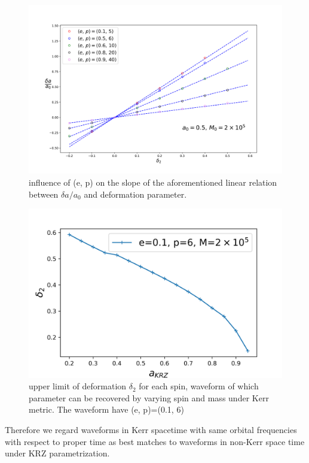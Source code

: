\documentclass{article}
\begin{document}
\begin{figure}[!htb]
	\centering
	\includegraphics[width=16cm]{d2_deltaspin_ep.png}

	\caption{influence of (e, p) on the slope of the aforementioned linear relation between $\delta a/a_0$ and deformation parameter. }
	\label{ep_slope}
\end{figure}

\begin{figure}[!htb]
	\centering
	\includegraphics[width=16cm]{limit_d2_e01_p6.png}
	
	\caption{upper limit of deformation $\delta_2$ for each spin, waveform of which parameter can be recovered by varying spin and mass under Kerr metric. The waveform have (e, p)=(0.1, 6)}
	\label{d2limit}
\end{figure}
Therefore we regard waveforms in Kerr spacetime with same orbital frequencies with respect to proper time as best matches to waveforms in non-Kerr space time under KRZ parametrization.
\end{document}
